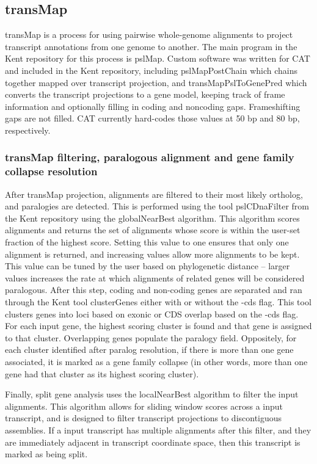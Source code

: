 \documentclass[fleqn,10pt]{wlscirep}
\begin{document}
\subsection*{transMap}
	transMap \cite{stanke2008using,zhu2007comparative} is a process for using pairwise whole-genome alignments to project transcript annotations from one genome to another. The main program in the Kent repository for this process is pslMap. Custom software was written for CAT and included in the Kent repository, including pslMapPostChain which chains together mapped over transcript projection, and transMapPslToGenePred which converts the transcript projections to a gene model, keeping track of frame information and optionally filling in coding and noncoding gaps. Frameshifting gaps are not filled. CAT currently hard-codes those values at 50 bp and 80 bp, respectively.
  
\subsubsection*{transMap filtering, paralogous alignment and gene family collapse resolution}
	After transMap projection, alignments are filtered to their most likely ortholog, and paralogies are detected. This is performed using the tool pslCDnaFilter from the Kent repository using the globalNearBest algorithm. This algorithm scores alignments and returns the set of alignments whose score is within the user-set fraction of the highest score. Setting this value to one ensures that only one alignment is returned, and increasing values allow more alignments to be kept. This value can be tuned by the user based on phylogenetic distance -- larger values increases the rate at which alignments of related genes will be considered paralogous. After this step, coding and non-coding genes are separated and ran through the Kent tool clusterGenes either with or without the -cds flag. This tool clusters genes into loci based on exonic or CDS overlap based on the -cds flag. For each input gene, the highest scoring cluster is found and that gene is assigned to that cluster. Overlapping genes populate the paralogy field. Oppositely, for each cluster identified after paralog resolution, if there is more than one gene associated, it is marked as a gene family collapse (in other words, more than one gene had that cluster as its highest scoring cluster).
    
    Finally, split gene analysis uses the localNearBest algorithm to filter the input alignments. This algorithm allows for sliding window scores across a input transcript, and is designed to filter transcript projections to discontiguous assemblies. If a input transcript has multiple alignments after this filter, and they are immediately adjacent in transcript coordinate space, then this transcript is marked as being split.
\end{document}
